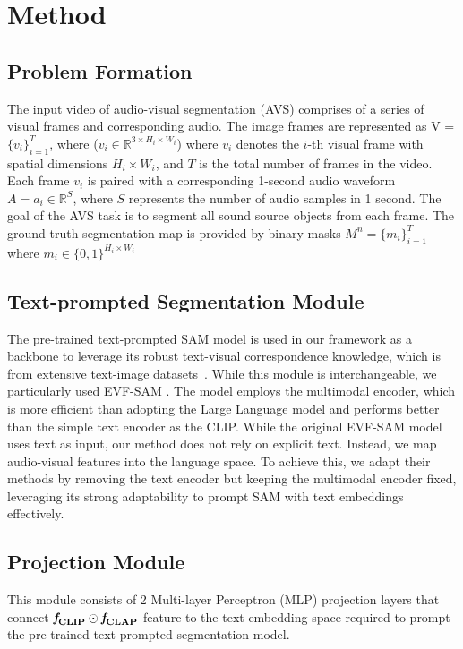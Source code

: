 \section{Method}
\subsection{Problem Formation}
The input video of audio-visual segmentation (AVS) comprises of a series of visual frames and corresponding audio. The image frames are represented as V = $\{v_i\}^T_{i=1}$,  where ($v_i \in \mathbb{R}^{3 \times H_i \times W_i}$)
where \( v_i \) denotes the \( i\)-th visual frame with spatial dimensions \( H_i \times W_i \), and \( T \) is the total number of frames in the video. Each frame \( v_i \) is paired with a corresponding 1-second audio waveform $A = a_i \in \mathbb{R}^S$, where \( S \) represents the number of audio samples in 1 second.
The goal of the AVS task is to segment all sound source objects from each frame. The ground truth segmentation map is provided by binary masks 
$M^n = \{m_i\}_{i=1}^T$ where $m_i \in \{0, 1\}^{H_i \times W_i}$

\subsection{Text-prompted Segmentation Module}
The pre-trained text-prompted SAM model is used in our framework as a backbone to leverage its robust text-visual correspondence knowledge, which is from
extensive text-image datasets~\cite{kazemzadeh2014referitgamedata, yu2016refcocodata,nagaraja2016refcocogdata}. While this module is interchangeable, we particularly used EVF-SAM \cite{zhang2024evfsam}. The model employs the multimodal encoder, which is more efficient than adopting the Large Language model and performs better than the simple text encoder as the CLIP. While the original EVF-SAM model uses text as input, our method does not rely on explicit text. Instead, we map audio-visual features into the language space. To achieve this, we adapt their methods by removing the text encoder but keeping the multimodal encoder fixed, leveraging its strong adaptability to prompt SAM with text embeddings effectively.

\subsection{Projection Module}
This module consists of 2 Multi-layer Perceptron (MLP) projection layers that connect $\mathbf{\textit{\textbf{f}}_{CLIP} \odot \textit{\textbf{f}}_{CLAP}}$ feature to the text embedding space required to prompt the pre-trained text-prompted segmentation model. 

